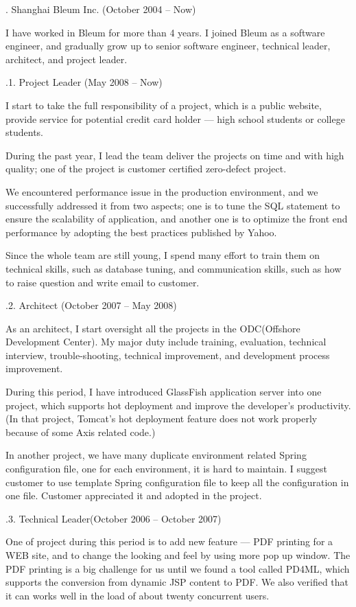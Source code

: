. Shanghai Bleum Inc. (October 2004 -- Now)\par

\noindent
I have worked in Bleum for more than 4 years. I joined Bleum as a software  
engineer, and gradually grow up to senior software engineer, technical leader,
architect, and project leader. 

\smallskip\noindent
{}.1. Project Leader (May 2008 -- Now)\par
\noindent
I start to take the full responsibility of a project, which is a public website, provide service for 
potential credit card holder --- high school students or college students. 

During the past year, I lead the team deliver the projects on time and with high quality;
one of the project is customer certified zero-defect project.

We encountered performance issue in the production environment, and we successfully
addressed it from two aspects; one is to tune the SQL statement to ensure the scalability
of application, and another one is to optimize the front end performance by adopting
the best practices published by Yahoo.
  
Since the whole team are still young, I spend many effort to train them on 
technical skills, such as database tuning, and communication skills, such as
how to raise question and write email to customer.

\smallskip\noindent
{}.2. Architect (October 2007 -- May 2008)\par
\noindent
As an architect, I start oversight all the projects in the ODC(Offshore Development Center).
My major duty include training, evaluation, technical interview, trouble-shooting,
 technical improvement, and development process improvement. 

During this period, I have introduced GlassFish application server into one project, which 
supports hot deployment and improve the developer's productivity. (In that project, Tomcat's
hot deployment feature does not work properly because of some Axis related code.)

In another project, we have many duplicate environment related Spring 
configuration file, one for 
each environment, it is hard to maintain. I suggest customer to use 
template Spring configuration file
to keep all the configuration in one file. 
Customer appreciated it and adopted in the project.

.3. Technical Leader(October 2006 -- October 2007)\par
\noindent
One of project during this period is to add new feature --- PDF printing for a WEB site, and to
change the looking and feel by using more pop up window. The PDF printing 
is a big challenge for us until we found a tool called PD4ML, which supports
the conversion from dynamic JSP content to PDF. We also verified that it can 
works well in the load of about twenty concurrent users. 

